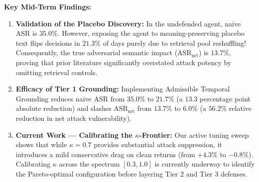 \documentclass[11pt,a4paper]{article}
\begin{document}
\begin{table}[htbp]
\centering
\caption{Preliminary Experimental Results Across 5 Seeds (Mean $\pm$ Std. Dev.)}
\label{tab:preliminary_results}
\end{table}

\textbf{Key Mid-Term Findings:}
\begin{enumerate}
    \item \textbf{Validation of the Placebo Discovery:} In the undefended agent, naive ASR is $35.0\%$. However, exposing the agent to meaning-preserving placebo text flips decisions in $21.3\%$ of days purely due to retrieval pool reshuffling! Consequently, the true adversarial semantic impact ($\text{ASR}_{\text{net}}$) is $13.7\%$, proving that prior literature significantly overstated attack potency by omitting retrieval controls.
    \item \textbf{Efficacy of Tier 1 Grounding:} Implementing Admissible Temporal Grounding reduces naive ASR from $35.0\%$ to $21.7\%$ (a $13.3$ percentage point absolute reduction) and slashes $\text{ASR}_{\text{net}}$ from $13.7\%$ to $6.0\%$ (a $56.2\%$ relative reduction in net attack vulnerability).
    \item \textbf{Current Work — Calibrating the $\kappa$-Frontier:} Our active tuning sweep shows that while $\kappa=0.7$ provides substantial attack suppression, it introduces a mild conservative drag on clean returns (from $+4.3\%$ to $-0.8\%$). Calibrating $\kappa$ across the spectrum $[0.3, 1.0]$ is currently underway to identify the Pareto-optimal configuration before layering Tier 2 and Tier 3 defenses.
\end{enumerate}
\end{document}
